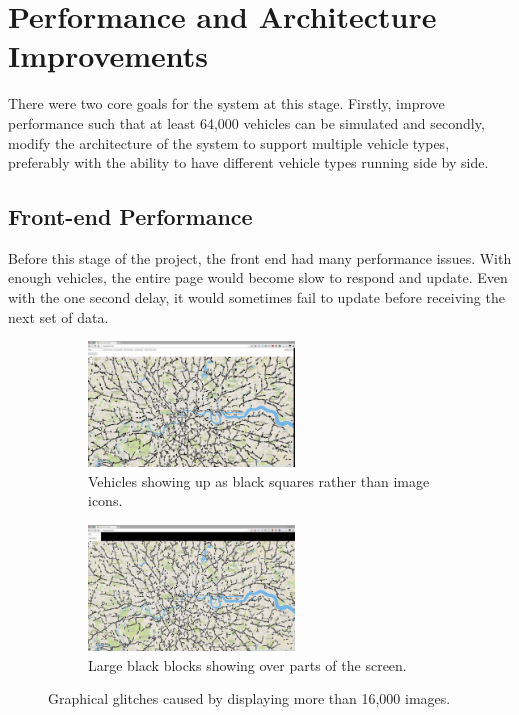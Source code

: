 \documentclass[ %
                    author={Alexander Hill},
                supervisor={Dr. Benjamin Sach},
                    degree={MEng},
                     title={MARMOSET},
                  subtitle={Multi-Agent Route Management using Online Simulation for Efficient Transportation},
                      type={research},
                      year={2016} ]{dissertation}
\begin{document}
\section{Performance and Architecture Improvements}

There were two core goals for the system at this stage. Firstly, improve
performance such that at least 64,000 vehicles can be simulated and secondly,
modify the architecture of the system to support multiple vehicle types,
preferably with the ability to have different vehicle types running side by
side.

\subsection{Front-end Performance}

Before this stage of the project, the front end had many performance issues.
With enough vehicles, the entire page would become slow to respond and update.
Even with the one second delay, it would sometimes fail to update before
receiving the next set of data.

\begin{figure}[h]
\centering
\begin{subfigure}[b]{0.4\textwidth}
    \centering
    \includegraphics[height=9em]{glitches-car}
    \caption{Vehicles showing up as black squares rather than image icons.}\label{fig:glitches-car}
\end{subfigure}
\hspace{3em}
\begin{subfigure}[b]{0.4\textwidth}
    \centering
    \includegraphics[height=9em]{glitches-chrome}
    \caption{Large black blocks showing over parts of the screen.}\label{fig:glitches-chrome}
\end{subfigure}
\caption{Graphical glitches caused by displaying more than 16,000 images.}
\end{figure}
\end{document}
